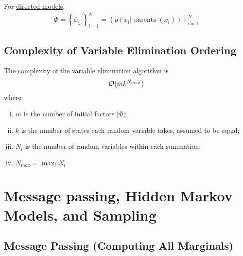 \documentclass{article}
\begin{document}
	\begin{remark}
		For \ul{directed models},
		\begin{align}
			\Phi=\left\{\phi_{x_{i}}\right\}_{i=1}^{N}=\left\{p\left(x_{i} | \text { parents }\left(x_{i}\right)\right)\right\}_{i=1}^{N}
		\end{align}
	\end{remark}
	
	
	\subsection{Complexity of Variable Elimination Ordering}
	\begin{theorem}
		The complexity of the variable elimination algorithm is
		\begin{align}
			\mathcal{{O}}(m k^{N_{max}})
		\end{align}
		where
		\begin{enumerate}[(i)]
			\item $m$ is the number of initial factors $|\Phi|$;
			\item $k$ is the number of states each random variable takes, assumed to be equal;
			\item $N_i$ is the number of random variables within each summation;
			\item $N_{max} = \max_i N_i$.
		\end{enumerate}
	\end{theorem}
	
	\section{Message passing, Hidden Markov Models, and Sampling}

	\subsection{Message Passing (Computing All Marginals)}
	
\end{document}
